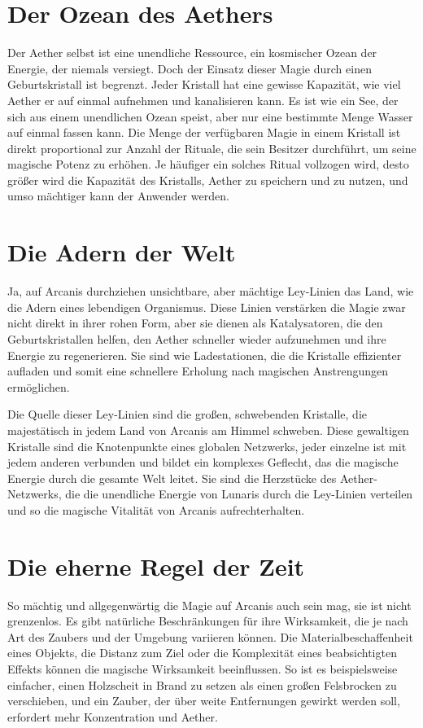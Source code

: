 \documentclass[10pt,a4paper,twocolumn,openany]{book}
\begin{document}
\section{Der Ozean des Aethers}

Der Aether selbst ist eine unendliche Ressource, ein kosmischer Ozean der Energie, der niemals versiegt. Doch der Einsatz dieser Magie durch einen Geburtskristall ist begrenzt. Jeder Kristall hat eine gewisse Kapazität, wie viel Aether er auf einmal aufnehmen und kanalisieren kann. Es ist wie ein See, der sich aus einem unendlichen Ozean speist, aber nur eine bestimmte Menge Wasser auf einmal fassen kann. Die Menge der verfügbaren Magie in einem Kristall ist direkt proportional zur Anzahl der Rituale, die sein Besitzer durchführt, um seine magische Potenz zu erhöhen. Je häufiger ein solches Ritual vollzogen wird, desto größer wird die Kapazität des Kristalls, Aether zu speichern und zu nutzen, und umso mächtiger kann der Anwender werden.

\section{Die Adern der Welt}

Ja, auf Arcanis durchziehen unsichtbare, aber mächtige Ley-Linien das Land, wie die Adern eines lebendigen Organismus. Diese Linien verstärken die Magie zwar nicht direkt in ihrer rohen Form, aber sie dienen als Katalysatoren, die den Geburtskristallen helfen, den Aether schneller wieder aufzunehmen und ihre Energie zu regenerieren. Sie sind wie Ladestationen, die die Kristalle effizienter aufladen und somit eine schnellere Erholung nach magischen Anstrengungen ermöglichen.

Die Quelle dieser Ley-Linien sind die großen, schwebenden Kristalle, die majestätisch in jedem Land von Arcanis am Himmel schweben. Diese gewaltigen Kristalle sind die Knotenpunkte eines globalen Netzwerks, jeder einzelne ist mit jedem anderen verbunden und bildet ein komplexes Geflecht, das die magische Energie durch die gesamte Welt leitet. Sie sind die Herzstücke des Aether-Netzwerks, die die unendliche Energie von Lunaris durch die Ley-Linien verteilen und so die magische Vitalität von Arcanis aufrechterhalten.

\section{Die eherne Regel der Zeit}

So mächtig und allgegenwärtig die Magie auf Arcanis auch sein mag, sie ist nicht grenzenlos. Es gibt natürliche Beschränkungen für ihre Wirksamkeit, die je nach Art des Zaubers und der Umgebung variieren können. Die Materialbeschaffenheit eines Objekts, die Distanz zum Ziel oder die Komplexität eines beabsichtigten Effekts können die magische Wirksamkeit beeinflussen. So ist es beispielsweise einfacher, einen Holzscheit in Brand zu setzen als einen großen Felsbrocken zu verschieben, und ein Zauber, der über weite Entfernungen gewirkt werden soll, erfordert mehr Konzentration und Aether.
\end{document}
